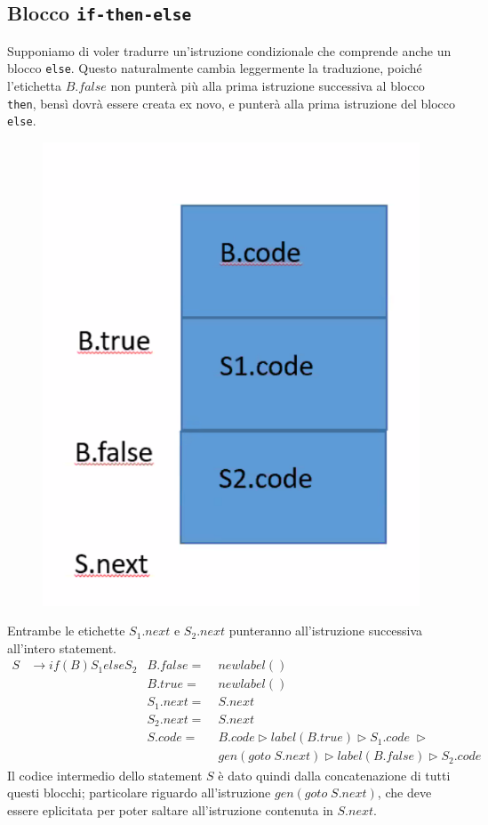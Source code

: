 \documentclass[class=book, crop=false, oneside, 12pt]{standalone}
\begin{document}
\subsection{Blocco \texttt{if-then-else}}
Supponiamo di voler tradurre un'istruzione condizionale che comprende anche un blocco \texttt{else}. Questo naturalmente cambia leggermente la traduzione, poiché l'etichetta \(B.false\) non punterà più alla prima istruzione successiva al blocco \texttt{then}, bensì dovrà essere creata ex novo, e punterà alla prima istruzione del blocco \texttt{else}.
\begin{figure}[H]
    \centering
    \includegraphics[width=.4\textwidth]{if-else-trans.png}
    \caption{}
\end{figure}
Entrambe le etichette \(S_1.next\) e \(S_2.next\) punteranno all'istruzione successiva all'intero statement.
\begin{align*}
    S &\to if (B) S_1 else S_2 & B.false =\; &newlabel() \\
    & & B.true =\; &newlabel() \\
    & & S_1.next =\; &S.next \\
    & & S_2.next =\; &S.next \\
    & & S.code =\; &B.code \triangleright label(B.true) \triangleright S_1.code\; \triangleright \\
    & & &gen(goto\; S.next) \triangleright label(B.false) \triangleright S_2.code
\end{align*}
Il codice intermedio dello statement \(S\) è dato quindi dalla concatenazione di tutti questi blocchi; particolare riguardo all'istruzione \(gen(goto\; S.next)\), che deve essere eplicitata per poter saltare all'istruzione contenuta in \(S.next\).
\end{document}

